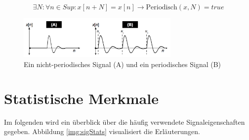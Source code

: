 \begin{equation}
\exists N : \forall n \in Sup : x[n+N] = x[n] \rightarrow \text{Periodisch}(x,N) = true
\label{eq:periodicity}
\end{equation}

\begin{figure}[h]
	\centering
	\includegraphics[width=0.7\textwidth]{bilder/periodicSig.png}
	\caption{Ein nicht-periodisches Signal (A) und ein periodisches Signal (B)}
	\label{img:periodicSic}
\end{figure}

\section{Statistische Merkmale}

Im folgenden wird ein überblick über die häufig verwendete Signaleigenschaften gegeben. Abbildung \ref{img:sigStats} visualisiert die Erläuterungen.

